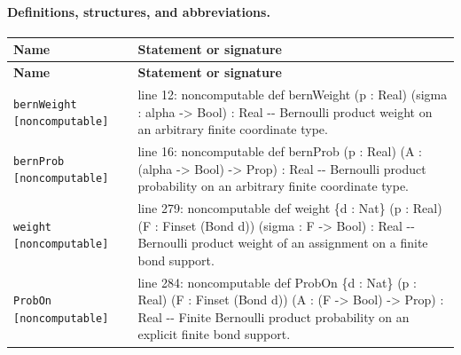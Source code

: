 \documentclass[10pt]{article}
\begin{document}
\paragraph{Definitions, structures, and abbreviations.}
\begin{longtable}{>{\raggedright\arraybackslash}p{} >{\raggedright\arraybackslash}p{}}
\textbf{Name} & \textbf{Statement or signature} \\
\hline
\endfirsthead
\textbf{Name} & \textbf{Statement or signature} \\
\hline
\endhead
\texttt{bernWeight [noncomputable]} & {\ttfamily\scriptsize line 12:\allowbreak{} noncomputable def bernWeight (\allowbreak{}p :\allowbreak{} Real)\allowbreak{} (\allowbreak{}sigma :\allowbreak{} alpha -\allowbreak{}> Bool)\allowbreak{} :\allowbreak{} Real -\allowbreak{}-\allowbreak{} Bernoulli product weight on an arbitrary finite coordinate type.\allowbreak{}} \\[0.45em]
\texttt{bernProb [noncomputable]} & {\ttfamily\scriptsize line 16:\allowbreak{} noncomputable def bernProb (\allowbreak{}p :\allowbreak{} Real)\allowbreak{} (\allowbreak{}A :\allowbreak{} (\allowbreak{}alpha -\allowbreak{}> Bool)\allowbreak{} -\allowbreak{}> Prop)\allowbreak{} :\allowbreak{} Real -\allowbreak{}-\allowbreak{} Bernoulli product probability on an arbitrary finite coordinate type.\allowbreak{}} \\[0.45em]
\texttt{weight [noncomputable]} & {\ttfamily\scriptsize line 279:\allowbreak{} noncomputable def weight \{d :\allowbreak{} Nat\} (\allowbreak{}p :\allowbreak{} Real)\allowbreak{} (\allowbreak{}F :\allowbreak{} Finset (\allowbreak{}Bond d)\allowbreak{})\allowbreak{} (\allowbreak{}sigma :\allowbreak{} F -\allowbreak{}> Bool)\allowbreak{} :\allowbreak{} Real -\allowbreak{}-\allowbreak{} Bernoulli product weight of an assignment on a finite bond support.\allowbreak{}} \\[0.45em]
\texttt{ProbOn [noncomputable]} & {\ttfamily\scriptsize line 284:\allowbreak{} noncomputable def ProbOn \{d :\allowbreak{} Nat\} (\allowbreak{}p :\allowbreak{} Real)\allowbreak{} (\allowbreak{}F :\allowbreak{} Finset (\allowbreak{}Bond d)\allowbreak{})\allowbreak{} (\allowbreak{}A :\allowbreak{} (\allowbreak{}F -\allowbreak{}> Bool)\allowbreak{} -\allowbreak{}> Prop)\allowbreak{} :\allowbreak{} Real -\allowbreak{}-\allowbreak{} Finite Bernoulli product probability on an explicit finite bond support.\allowbreak{}} \\[0.45em]
\end{longtable}
\end{document}
